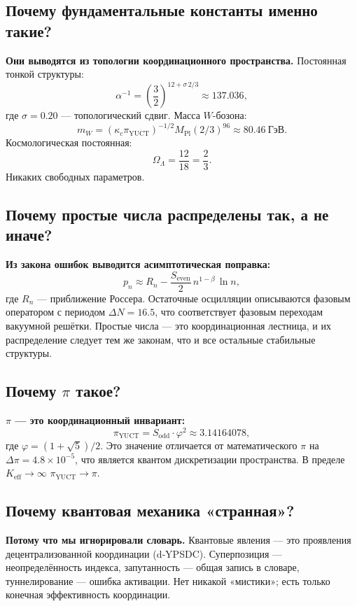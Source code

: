 \documentclass[12pt,a4paper]{article}
\newcommand{\Keff}{K_{\mathrm{eff}}}
\newcommand{\kappac}{\kappa_c}
\newcommand{\betaf}{\beta}
\newcommand{\Sodd}{S_{\mathrm{odd}}}
\newcommand{\Seven}{S_{\mathrm{even}}}
\newcommand{\piYUCT}{\pi_{\mathrm{YUCT}}}
\begin{document}
	\subsection{Почему фундаментальные константы именно такие?}
	
	\textbf{Они выводятся из топологии координационного пространства.} Постоянная тонкой структуры:
	\[
	\alpha^{-1} = \left(\frac{3}{2}\right)^{12 + \sigma\,2/3} \approx 137.036,
	\]
	где \(\sigma = 0.20\) — топологический сдвиг. Масса \(W\)-бозона:
	\[
	m_W = (\kappac \piYUCT)^{-1/2} M_{\mathrm{Pl}} (2/3)^{96} \approx 80.46\ \text{ГэВ}.
	\]
	Космологическая постоянная:
	\[
	\Omega_\Lambda = \frac{12}{18} = \frac{2}{3}.
	\]
	Никаких свободных параметров.
	
	\subsection{Почему простые числа распределены так, а не иначе?}
	
	\textbf{Из закона ошибок выводится асимптотическая поправка:}
	\[
	p_n \approx R_n - \frac{\Seven}{2}\, n^{1-\betaf}\,\ln n,
	\]
	где \(R_n\) — приближение Россера. Остаточные осцилляции описываются фазовым оператором с периодом \(\Delta N = 16.5\), что соответствует фазовым переходам вакуумной решётки. Простые числа — это координационная лестница, и их распределение следует тем же законам, что и все остальные стабильные структуры.
	
	\subsection{Почему \(\pi\) такое?}
	
	\textbf{\(\pi\) — это координационный инвариант:}
	\[
	\piYUCT = \Sodd \cdot \varphi^2 \approx 3.14164078,
	\]
	где \(\varphi = (1+\sqrt{5})/2\). Это значение отличается от математического \(\pi\) на \(\Delta\pi = 4.8\times10^{-5}\), что является квантом дискретизации пространства. В пределе \(\Keff \to \infty\) \(\piYUCT \to \pi\).
	
	\subsection{Почему квантовая механика «странная»?}
	
	\textbf{Потому что мы игнорировали словарь.} Квантовые явления — это проявления децентрализованной координации (d‑YPSDC). Суперпозиция — неопределённость индекса, запутанность — общая запись в словаре, туннелирование — ошибка активации. Нет никакой «мистики»; есть только конечная эффективность координации.
	
\end{document}
